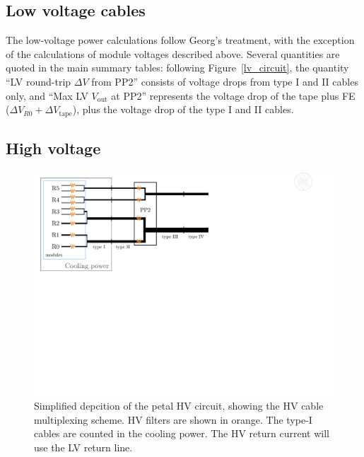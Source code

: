 \subsection{Low voltage cables}

The low-voltage power calculations follow Georg's treatment, with the exception of the
calculations of module voltages described above.
Several quantities are quoted in the main summary tables:
following Figure~\ref{lv_circuit}, the
quantity ``LV round-trip $\Delta V$ from PP2'' consists of voltage drops from type I and II cables
only, and ``Max LV $V_\text{out}$ at PP2'' represents the voltage drop of the tape plus FE
($\Delta V_{R0} + \Delta V_\text{tape}$), plus the voltage drop of the type I and II cables.

\subsection{High voltage}


\begin{figure}[ht!]
\begin{center}
\includegraphics[width=0.60\linewidth]{figures/HV_cartoon.pdf}
\end{center}
\caption{Simplified depcition of the petal HV circuit, showing the HV cable multiplexing scheme. HV filters are shown
in orange. The type-I cables are counted in the cooling power. The HV return current will use the LV return line.}
\label{hv_circuit}
\end{figure}

